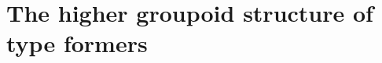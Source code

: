 \documentclass[hott-all.tex]{subfiles}
\begin{document}
\section{The higher groupoid structure of type formers}
\label{sec:computational}

%
%
%
%
\end{document}
